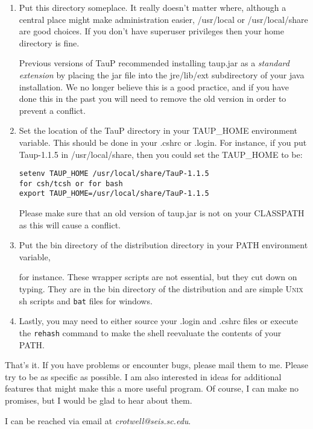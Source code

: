 \begin{enumerate}
\item Put this directory someplace. It really doesn't matter where, although
a central place might make administration easier, /usr/local or 
/usr/local/share are good choices. If you don't have superuser privileges
then your home directory is fine. 

Previous versions of TauP recommended installing taup.jar as a \textit{standard extension} by placing the jar file into the jre/lib/ext subdirectory of your java installation. We no longer believe this is a good
practice, and if you have done this in the past you will need to remove the old version in order to
prevent a conflict.

\item Set the location of the TauP directory in your TAUP_HOME environment variable.
This should be done in your .cshrc or .login. For instance, if you put Taup-1.1.5 in
/usr/local/share, then you could set the TAUP_HOME to be:
\begin{verbatim}
setenv TAUP_HOME /usr/local/share/TauP-1.1.5
for csh/tcsh or for bash
export TAUP_HOME=/usr/local/share/TauP-1.1.5
\end{verbatim} 

Please make sure that an old version of taup.jar is not on your CLASSPATH as this will cause a 
conflict.

\item Put the bin directory of the distribution directory in your PATH environment
variable,  for instance. These wrapper 
scripts are not essential, but they cut down on 
typing. They are in the bin directory of the distribution 
and are simple \textsc{Unix} sh scripts and \texttt{bat} files for windows.

\item Lastly, you may need to either source your .login and .cshrc files or
execute the \texttt{rehash} command to make the shell reevaluate the 
contents of your PATH.

\end{enumerate}

That's it. If you have problems or encounter bugs, please mail them to me.
Please try to be as specific as possible. I am also interested in ideas for
additional features that might make this a more useful program. 
Of course, I can make no promises,
but I would be glad to hear about them.

I can be reached via email at \textit{crotwell@seis.sc.edu}.

